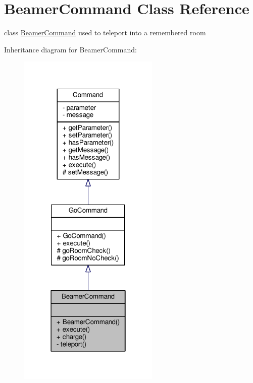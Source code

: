 \hypertarget{classBeamerCommand}{\section{Beamer\-Command Class Reference}
\label{classBeamerCommand}
}


class \hyperlink{classBeamerCommand}{Beamer\-Command} used to teleport into a remembered room  




Inheritance diagram for Beamer\-Command\-:
\nopagebreak
\begin{figure}[H]
\begin{center}
\leavevmode
\includegraphics[width=190pt]{classBeamerCommand__inherit__graph}
\end{center}
\end{figure}



